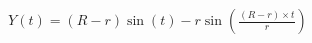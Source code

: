 \documentclass[preview]{standalone}
\begin{document}
\begin{align*}
Y(t) = (R - r) \sin(t) - r \sin\left(\frac{(R - r) \times t}{r}\right)
\end{align*}
\end{document}
